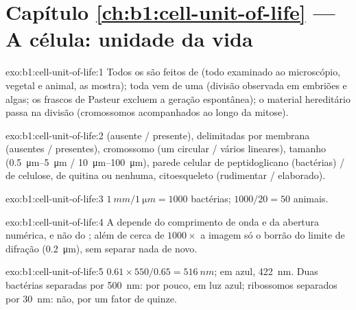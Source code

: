 \section*{Capítulo \ref{ch:b1:cell-unit-of-life} --- A célula: unidade da vida}

\begin{solution}{exo:b1:cell-unit-of-life:1}
Todos os  são feitos de  (todo  examinado ao
microscópio, vegetal e animal, as mostra); toda  vem de uma 
(divisão observada em embriões e algas; os frascos de Pasteur excluem a
geração espontânea); o material hereditário passa na divisão
(cromossomos acompanhados ao longo da mitose).
\end{solution}

\begin{solution}{exo:b1:cell-unit-of-life:2}
 (ausente / presente),  delimitadas por membrana
(ausentes / presentes), cromossomo (um circular / vários lineares),
tamanho (\qtyrange{0.5}{5}{\micro m} / \qtyrange{10}{100}{\micro m}),
parede celular de peptidoglicano (bactérias) / de celulose, de quitina
ou nenhuma, citoesqueleto (rudimentar / elaborado).
\end{solution}

\begin{solution}{exo:b1:cell-unit-of-life:3}
$\qty{1}{mm}/\qty{1}{\micro m} = 1000$ bactérias; $1000/20 = 50$ 
animais.
\end{solution}

\begin{solution}{exo:b1:cell-unit-of-life:4}
A  depende do comprimento de onda e da abertura numérica, e não
do ; além de cerca de $1000\times$ a imagem só  o borrão do
limite de difração (\qty{0.2}{\micro m}), sem separar nada de novo.
\end{solution}

\begin{solution}{exo:b1:cell-unit-of-life:5}
$0.61\times 550/0.65 = \qty{516}{nm}$; em azul, \qty{422}{nm}. Duas
bactérias separadas por \qty{500}{nm}: por pouco, em luz azul;
ribossomos separados por \qty{30}{nm}: não, por um fator de quinze.
\end{solution}

